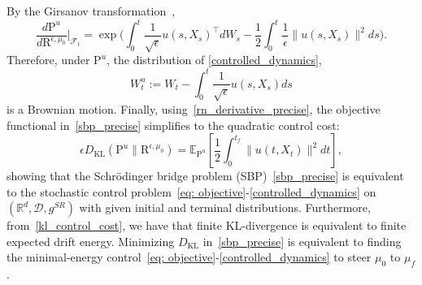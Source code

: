 \documentclass{amsart}
\numberwithin{equation}{section}
\newcommand{\R}{\mathbb{R}}
\newcommand{\KL}{D_{\mathrm{KL}}}
\begin{document}
By the Girsanov transformation~\cite[Chapter~8.6]{oksendal2003stochastic},
\begin{equation}\label{rn_derivative_precise}
\frac{d\mathrm{P}^u}{d\mathrm{R}^{\epsilon,\mu_0}}\Big|_{\mathcal{F}_t} 
= \exp\Bigg( \int_0^t \frac{1}{\sqrt{\epsilon}} u(s,  X_s)^\top dW_s - \frac12 \int_0^t \frac{1}{\epsilon} \|u(s,  X_s)\|^2 ds \Bigg). 
\end{equation}
Therefore, under $\mathrm{P}^u$, the distribution of \eqref{controlled_dynamics},
\[
W_t^u := W_t - \int_0^t \frac{1}{\sqrt{\epsilon}} u(s,  X_s) ds
\]
is a Brownian motion. 
Finally, using~\eqref{rn_derivative_precise}, the objective functional in~\eqref{sbp_precise} simplifies to the quadratic control cost:
\begin{equation}\label{kl_control_cost}
\epsilon\KL(\mathrm{P}^u \| \mathrm{R}^{\epsilon,\mu_0}) = \mathbb{E}_{\mathrm{P}^u} \left[ \frac12 \int_0^{t_f} \|u(t,  X_t)\|^2 dt \right],
\end{equation}
showing that the Schr\"odinger bridge problem (SBP)~\eqref{sbp_precise} is equivalent to the stochastic control problem~\eqref{eq: objective}-\eqref{controlled_dynamics} on $(\R^d,\mathcal{D},g^{SR})$ with given initial and terminal distributions. Furthermore, from~\eqref{kl_control_cost}, we have that finite KL-divergence is equivalent to finite expected drift energy. Minimizing $\KL$ in~\eqref{sbp_precise} is equivalent to finding the minimal-energy control~\eqref{eq: objective}-\eqref{controlled_dynamics} to steer $\mu_0$ to $\mu_f$.  
\end{document}
